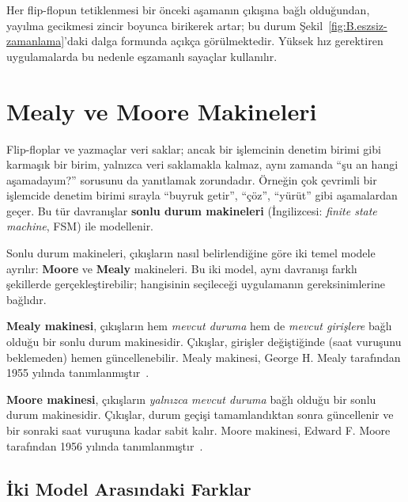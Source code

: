 Her flip-flopun tetiklenmesi bir önceki aşamanın çıkışına bağlı olduğundan, yayılma gecikmesi zincir boyunca birikerek artar; bu durum Şekil~\ref{fig:B.eszsiz-zamanlama}'daki dalga formunda açıkça görülmektedir. Yüksek hız gerektiren uygulamalarda bu nedenle eşzamanlı sayaçlar kullanılır.


\section{Mealy ve Moore Makineleri}

Flip-floplar ve yazmaçlar veri saklar; ancak bir işlemcinin denetim birimi gibi karmaşık bir birim, yalnızca veri saklamakla kalmaz, aynı zamanda ``şu an hangi aşamadayım?'' sorusunu da yanıtlamak zorundadır. Örneğin çok çevrimli bir işlemcide denetim birimi sırayla ``buyruk getir'', ``çöz'', ``yürüt'' gibi aşamalardan geçer. Bu tür davranışlar \textbf{sonlu durum makineleri} (İngilizcesi: \emph{finite state machine}, FSM) ile modellenir.

Sonlu durum makineleri, çıkışların nasıl belirlendiğine göre iki temel modele ayrılır: \textbf{Moore} ve \textbf{Mealy} makineleri. Bu iki model, aynı davranışı farklı şekillerde gerçekleştirebilir; hangisinin seçileceği uygulamanın gereksinimlerine bağlıdır.

\begin{tanim}
\textbf{Mealy makinesi}, çıkışların hem \emph{mevcut duruma} hem de \emph{mevcut girişlere} bağlı olduğu bir sonlu durum makinesidir. Çıkışlar, girişler değiştiğinde (saat vuruşunu beklemeden) hemen güncellenebilir. Mealy makinesi, George H. Mealy tarafından 1955 yılında tanımlanmıştır~\cite{mealy1955}.
\end{tanim}

\begin{tanim}
\textbf{Moore makinesi}, çıkışların \emph{yalnızca mevcut duruma} bağlı olduğu bir sonlu durum makinesidir. Çıkışlar, durum geçişi tamamlandıktan sonra güncellenir ve bir sonraki saat vuruşuna kadar sabit kalır. Moore makinesi, Edward F. Moore tarafından 1956 yılında tanımlanmıştır~\cite{moore1956}.
\end{tanim}

\subsection{İki Model Arasındaki Farklar}

